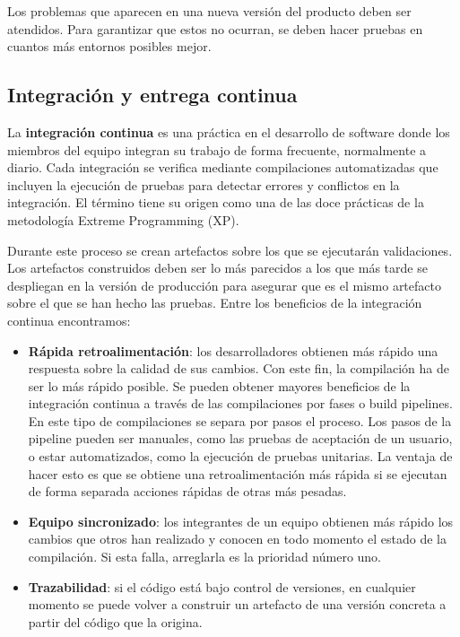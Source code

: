 \documentclass[11pt,spanish,listoffigures]{tfgetsinf}
\begin{document}
Los problemas que aparecen en una nueva versión del producto deben ser atendidos. Para garantizar que estos no ocurran, se deben hacer pruebas en cuantos más entornos posibles mejor.

\subsection{Integración y entrega continua}

La \textbf{integración continua} es una práctica en el desarrollo de software donde los miembros del equipo integran su trabajo de forma frecuente, normalmente a diario. Cada integración se verifica mediante compilaciones automatizadas que incluyen la ejecución de pruebas para detectar errores y conflictos en la integración. \cite{Fowler2006} El término tiene su origen como una de las doce prácticas de la metodología Extreme Programming (XP).

Durante este proceso se crean artefactos sobre los que se ejecutarán validaciones. Los artefactos construidos deben ser lo más parecidos a los que más tarde se despliegan en la versión de producción para asegurar que es el mismo artefacto sobre el que se han hecho las pruebas. Entre los beneficios de la integración continua encontramos:
 
\begin{itemize}

\item \textbf{Rápida retroalimentación}: los desarrolladores obtienen más rápido una respuesta sobre la calidad de sus cambios. Con este fin, la compilación ha de ser lo más rápido posible. Se pueden obtener mayores beneficios de la integración continua a través de las compilaciones por fases o build pipelines. En este tipo de compilaciones se separa por pasos el proceso. Los pasos de la pipeline pueden ser manuales, como las pruebas de aceptación de un usuario, o estar automatizados, como la ejecución de pruebas unitarias. La ventaja de hacer esto es que se obtiene una retroalimentación más rápida si se ejecutan de forma separada acciones rápidas de otras más pesadas. \cite{Fowler2006}

\item \textbf{Equipo sincronizado}: los integrantes de un equipo obtienen más rápido los cambios que otros han realizado y conocen en todo momento el estado de la compilación. Si esta falla, arreglarla es la prioridad número uno.

\item \textbf{Trazabilidad}: si el código está bajo control de versiones, en cualquier momento se puede volver a construir un artefacto de una versión concreta a partir del código que la origina. \cite{Newman2015a}

\end{itemize}
\end{document}
